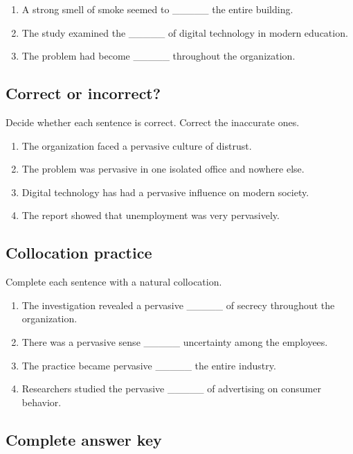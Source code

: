 \documentclass[11pt]{article}
\begin{document}
\begin{enumerate}
  \item A strong smell of smoke seemed to \_\_\_\_\_ the entire building.
  \item The study examined the \_\_\_\_\_ of digital technology in modern education.
  \item The problem had become \_\_\_\_\_ throughout the organization.
\end{enumerate}

\subsection{Correct or incorrect?}
Decide whether each sentence is correct. Correct the inaccurate ones.

\begin{enumerate}
  \item The organization faced a pervasive culture of distrust.
  \item The problem was pervasive in one isolated office and nowhere else.
  \item Digital technology has had a pervasive influence on modern society.
  \item The report showed that unemployment was very pervasively.
\end{enumerate}

\subsection{Collocation practice}
Complete each sentence with a natural collocation.

\begin{enumerate}
  \item The investigation revealed a pervasive \_\_\_\_\_ of secrecy throughout the organization.
  \item There was a pervasive sense \_\_\_\_\_ uncertainty among the employees.
  \item The practice became pervasive \_\_\_\_\_ the entire industry.
  \item Researchers studied the pervasive \_\_\_\_\_ of advertising on consumer behavior.
\end{enumerate}

\subsection{Complete answer key}
\end{document}
